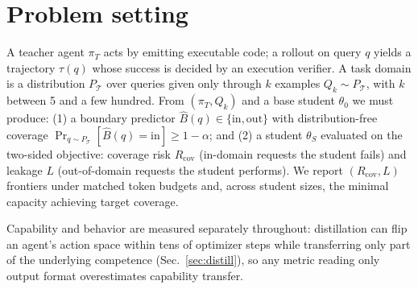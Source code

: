 \section{Problem setting}\label{sec:setting}
A teacher agent $\pi_T$ acts by emitting executable code; a rollout on query
$q$ yields a trajectory $\tau(q)$ whose success is decided by an execution
verifier. A task domain is a distribution $P_\mathcal{T}$ over queries given
only through $k$ examples $Q_k \sim P_\mathcal{T}$, with $k$ between 5 and a
few hundred. From $(\pi_T, Q_k)$ and a base student $\theta_0$ we must
produce: (1) a boundary predictor $\hat{B}(q) \in \{\text{in},\text{out}\}$
with distribution-free coverage $\Pr_{q\sim P_\mathcal{T}}[\hat{B}(q)=
\text{in}] \ge 1-\alpha$; and (2) a student $\theta_S$ evaluated on the
two-sided objective: coverage risk $R_{\mathrm{cov}}$ (in-domain requests the
student fails) and leakage $L$ (out-of-domain requests the student performs).
We report $(R_{\mathrm{cov}}, L)$ frontiers under matched token budgets and,
across student sizes, the minimal capacity achieving target coverage.

Capability and behavior are measured separately throughout: distillation can
flip an agent's action space within tens of optimizer steps while transferring
only part of the underlying competence (Sec.~\ref{sec:distill}), so any
metric reading only output format overestimates capability transfer.
